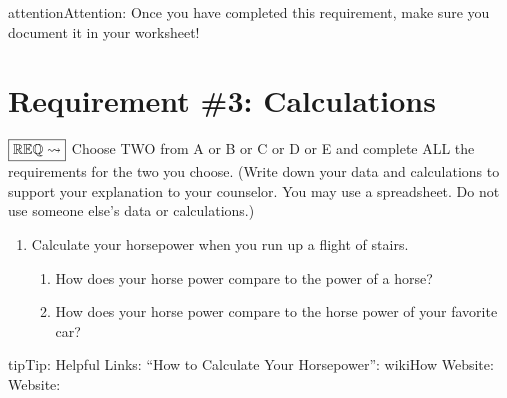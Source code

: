 \documentclass[letterpaper,10pt,english,openany,oneside]{sphinxmanual}
\let\sphinxpxdimen\pdfpxdimen\else\newdimen\sphinxpxdimen
\begin{document}
\begin{figure}[htbp]
\centering

\noindent\sphinxincludegraphics[width=700\sphinxpxdimen]{{meritbadges}.png}
\end{figure}

\begin{sphinxadmonition}{attention}{Attention:}
Once you have completed this requirement, make sure you document it in your worksheet!
\end{sphinxadmonition}


\chapter{Requirement \#3: Calculations}
\label{\detokenize{requirement3:requirement-3-calculations}}\label{\detokenize{requirement3::doc}}
\(\boxed{\mathbb{REQ}\Large \rightsquigarrow}\) Choose TWO from A or B or C or D or E and complete ALL the requirements for the two you choose. (Write down your data and calculations to support your explanation to your counselor. You may use a spreadsheet. Do not use someone else’s data or calculations.)
\begin{enumerate}
%
\item {} 
Calculate your horsepower when you run up a flight of stairs.
\begin{enumerate}
%
\item {} 
How does your horse power compare to the power of a horse?

\item {} 
How does your horse power compare to the horse power of your favorite car?

\end{enumerate}

\end{enumerate}

\begin{sphinxadmonition}{tip}{Tip:}
Helpful Links: “How to Calculate Your Horsepower”: wikiHow  Website:  Website: 
\end{sphinxadmonition}
\end{document}
